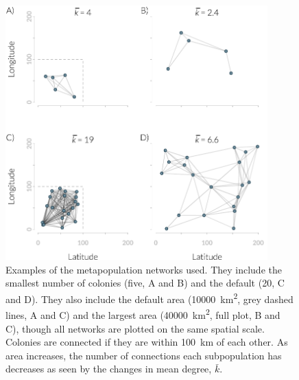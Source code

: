 
















\begin{knitrout}\footnotesize
{}\color{fgcolor}\begin{figure}[t]

{\centering \includegraphics[width=0.9\textwidth]{figure/colonyNetworkPlots-1} 

}

\caption[Example metapopulation networks]{
Examples of the metapopulation networks used.
They include the smallest number of colonies (five, A and B) and the default (20, C and D).
They also include the default area (\SI{10000}{\square\kilo\metre}, grey dashed lines, A and C) and the largest area (\SI{40000}{\square\kilo\metre}, full plot, B and C), though all networks are plotted on the same spatial scale.
Colonies are connected if they are within \SI{100}{\kilo\meter} of each other.
As area increases, the number of connections each subpopulation has decreases as seen by the changes in mean degree, $\bar{k}$.
}\label{fig:colonyNetworkPlots}
\end{figure}


\end{knitrout}











